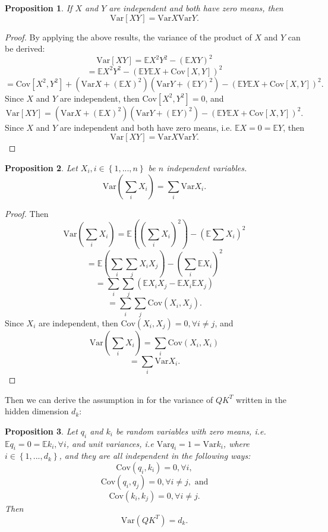 \documentclass{article}
\theoremstyle{plain}
\theoremstyle{plain} %
\newtheorem{proposition}{Proposition}
\theoremstyle{definition}  %
\theoremstyle{remark}  %
\theoremstyle{plain}
\begin{document}
\begin{proposition}
If $X$ and $Y$ are independent and both have zero means, then 
$$
\text{Var}[XY]=\text{Var}X \text{Var}Y.
$$
\end{proposition}
\begin{proof}
By applying the above results, the variance of the product of $X$ and $Y$ can be derived:
$$
\text{Var}[XY]=\mathbb{E}X^2Y^2-(\mathbb{E}XY)^2
$$
$$
=\mathbb{E}X^2Y^2-(\mathbb{E}Y\mathbb{E}X+\text{Cov}[X,Y])^2
$$
$$
=\text{Cov}[X^2,Y^2]+(\text{Var}X+(\mathbb{E} X)^2)(\text{Var}Y+(\mathbb{E} Y)^2)-(\mathbb{E}Y\mathbb{E}X+\text{Cov}[X,Y])^2.
$$
Since $X$ and $Y$ are independent, then $\text{Cov}[X^2,Y^2]=0$, and 
$$
\text{Var}[XY]=(\text{Var}X+(\mathbb{E} X)^2)(\text{Var}Y+(\mathbb{E} Y)^2)-(\mathbb{E}Y\mathbb{E}X+\text{Cov}[X,Y])^2.
$$
Since $X$ and $Y$ are independent and both have zero means, i.e. $\mathbb{E}X=0=\mathbb{E}Y$, then
$$
\text{Var}[XY]=\text{Var}X \text{Var}Y.
$$
\end{proof}
\begin{proposition}
Let $X_i, i\in\left\lbrace 1,...,n\right\rbrace$ be $n$ independent variables. 
$$
\text{Var}\left( \sum\limits_{i} X_i\right)=\sum\limits_i \text{Var}X_i.
$$
\end{proposition}
\begin{proof}
Then 
$$
\text{Var}\left( \sum\limits_{i} X_i\right)=\mathbb{E} \left(\left( \sum\limits_{i}X_i\right)^2 \right)-\left( \mathbb{E} \sum X_i\right)^2
$$
$$
=\mathbb{E}\left( \sum\limits_{i}\sum\limits_{j}X_iX_j \right)-\left(\sum\limits_i \mathbb{E} X_i \right)^2
$$
$$
=\sum\limits_i\sum\limits_j \left( \mathbb{E}X_iX_j-\mathbb{E}X_i\mathbb{E}X_j\right)
$$
$$
=\sum\limits_i\sum\limits_j \text{Cov}\left( X_i,X_j\right).
$$
Since $X_i$ are independent, then $\text{Cov}\left( X_i,X_j\right)=0, \forall i\neq j$, and
$$
\text{Var}\left( \sum\limits_{i} X_i\right)=\sum\limits_i \text{Cov}\left( X_i,X_i\right)
$$
$$
=\sum\limits_i \text{Var}X_i.
$$
\end{proof}
Then we can derive the assumption in \cite{vaswani2017attention} for the variance of $QK^T$ written in the hidden dimension $d_k$:
\begin{proposition}
Let $q_i$ and $k_i$ be random variables with zero means, i.e. $\mathbb{E} q_i=0=\mathbb{E} k_i, \forall i$, and unit variances, i.e $\text{Var} q_i=1=\text{Var}k_i$, where $i\in\left\lbrace 1,...,d_k\right\rbrace$, and they are all independent in the following ways:
$$
\text{Cov}\left( q_i,k_i\right)=0, \forall i,
$$
$$
\text{Cov}\left( q_i,q_j\right)=0, \forall i\neq j, \text{ and}
$$
$$
\text{Cov}\left( k_i,k_j\right)=0, \forall i\neq j.
$$
Then
$$
\text{Var}\left( QK^T\right)=d_k.
$$
\end{proposition}
 
\end{document}
